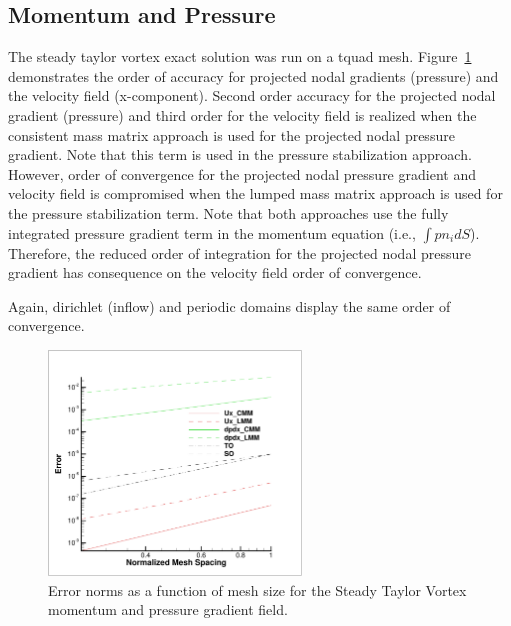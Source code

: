 \subsection{Momentum and Pressure}
The steady taylor vortex exact solution was run on a tquad mesh. Figure~\ref{fig:hoSTVMMS} demonstrates 
the order of accuracy for projected nodal gradients (pressure) and the velocity field (x-component). 
Second order accuracy for the projected nodal gradient (pressure) and third order for the velocity field
is realized when the consistent mass matrix approach is used for the projected nodal pressure gradient. 
Note that this term is used in the pressure stabilization approach. However, order of convergence for 
the projected nodal pressure gradient and velocity field is compromised when the lumped mass matrix approach
is used for the pressure stabilization term. Note that both approaches use the fully integrated pressure
gradient term in the momentum equation (i.e., $\int p n_i dS$). Therefore, the reduced order of integration
for the projected nodal pressure gradient has consequence on the velocity field order of convergence.
 
Again, dirichlet (inflow) and periodic domains display the same order of convergence.

\begin{figure}
\centerline{\includegraphics[width=0.6\textwidth]{figures/ho_stvUandDpDx.pdf}}
\caption{Error norms as a function of mesh size for the Steady Taylor Vortex momentum and pressure gradient field.}
\label{fig:hoSTVMMS}
\end{figure}
